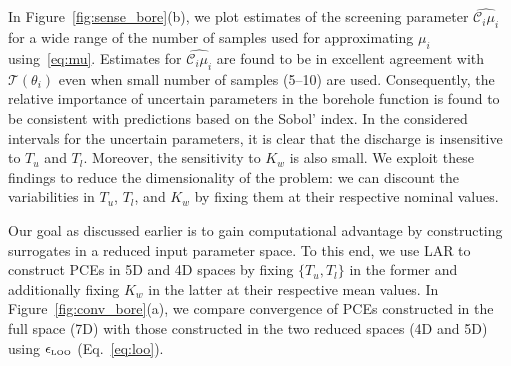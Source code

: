 In Figure~\ref{fig:sense_bore}(b), we plot estimates of the screening parameter 
$\widehat{\mathcal{C}_i\mu_i}$ for a wide range of the number of 
samples used for approximating $\mu_i$ using~\eqref{eq:mu}. 
Estimates for $\widehat{\mathcal{C}_i\mu_i}$ are found to be in excellent agreement
with $\mathcal{T}(\theta_i)$ even when small number of samples (5--10) are used. 
Consequently, the relative importance of uncertain 
parameters in the borehole function is found to be consistent 
with predictions based on the Sobol' index. 
In the considered intervals for the uncertain parameters, it is clear 
that the discharge is insensitive to $T_u$ and $T_l$. 
Moreover, the sensitivity to $K_w$ is also small. We exploit these findings to reduce
the dimensionality of the problem: we can 
discount the variabilities in $T_u$, $T_l$, and $K_w$ by fixing 
them at their respective nominal values. 

Our goal as discussed earlier is to gain computational advantage by constructing
surrogates in a reduced input parameter space. To this end, we use LAR to 
construct PCEs
in 5D and 4D spaces by fixing $\{T_u,T_l\}$ in the former and additionally
fixing $K_w$ in the latter at their respective mean values. In
Figure~\ref{fig:conv_bore}(a), we compare convergence of PCEs constructed in the
full space (7D) with those constructed in the two reduced spaces (4D and 5D)
using $\epsilon_{\mbox{\tiny{LOO}}}$ (Eq.~\ref{eq:loo}). 

